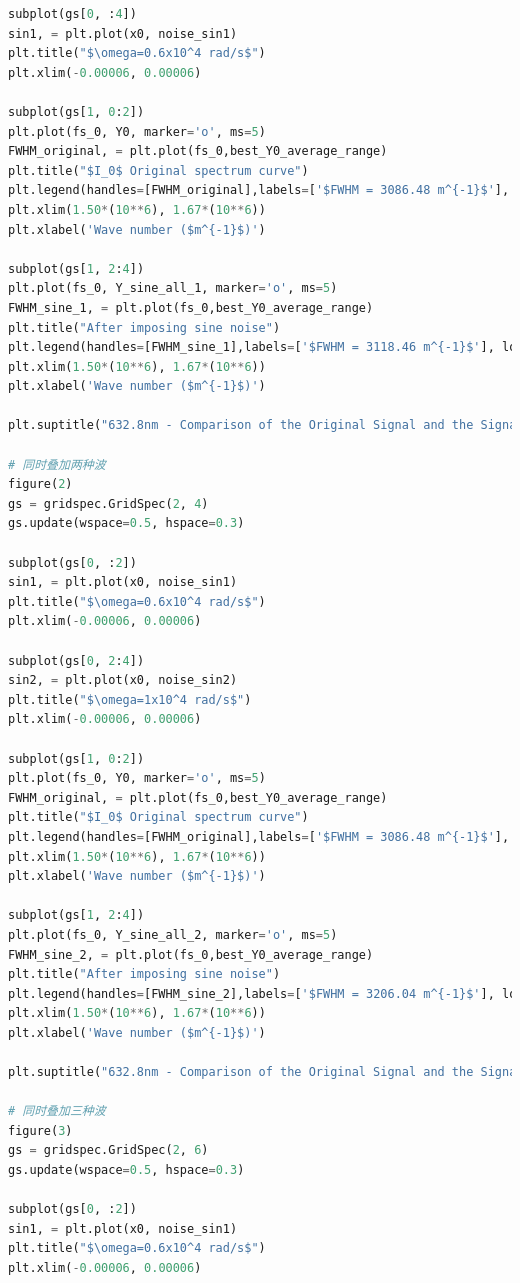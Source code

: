 \documentclass[conference]{IEEEtran}
\begin{document}
\begin{lstlisting}[language=python]
subplot(gs[0, :4])
sin1, = plt.plot(x0, noise_sin1)
plt.title("$\omega=0.6x10^4 rad/s$")
plt.xlim(-0.00006, 0.00006)

subplot(gs[1, 0:2])
plt.plot(fs_0, Y0, marker='o', ms=5)
FWHM_original, = plt.plot(fs_0,best_Y0_average_range)
plt.title("$I_0$ Original spectrum curve")
plt.legend(handles=[FWHM_original],labels=['$FWHM = 3086.48 m^{-1}$'], loc='upper right')
plt.xlim(1.50*(10**6), 1.67*(10**6))
plt.xlabel('Wave number ($m^{-1}$)')

subplot(gs[1, 2:4])
plt.plot(fs_0, Y_sine_all_1, marker='o', ms=5)
FWHM_sine_1, = plt.plot(fs_0,best_Y0_average_range)
plt.title("After imposing sine noise")
plt.legend(handles=[FWHM_sine_1],labels=['$FWHM = 3118.46 m^{-1}$'], loc='upper right')
plt.xlim(1.50*(10**6), 1.67*(10**6))
plt.xlabel('Wave number ($m^{-1}$)')

plt.suptitle("632.8nm - Comparison of the Original Signal and the Signal after Adding Sinusoidal Noise", fontsize = 20)

# 同时叠加两种波
figure(2)
gs = gridspec.GridSpec(2, 4)
gs.update(wspace=0.5, hspace=0.3)

subplot(gs[0, :2])
sin1, = plt.plot(x0, noise_sin1)
plt.title("$\omega=0.6x10^4 rad/s$")
plt.xlim(-0.00006, 0.00006)

subplot(gs[0, 2:4])
sin2, = plt.plot(x0, noise_sin2)
plt.title("$\omega=1x10^4 rad/s$")
plt.xlim(-0.00006, 0.00006)

subplot(gs[1, 0:2])
plt.plot(fs_0, Y0, marker='o', ms=5)
FWHM_original, = plt.plot(fs_0,best_Y0_average_range)
plt.title("$I_0$ Original spectrum curve")
plt.legend(handles=[FWHM_original],labels=['$FWHM = 3086.48 m^{-1}$'], loc='upper right')
plt.xlim(1.50*(10**6), 1.67*(10**6))
plt.xlabel('Wave number ($m^{-1}$)')

subplot(gs[1, 2:4])
plt.plot(fs_0, Y_sine_all_2, marker='o', ms=5)
FWHM_sine_2, = plt.plot(fs_0,best_Y0_average_range)
plt.title("After imposing sine noise")
plt.legend(handles=[FWHM_sine_2],labels=['$FWHM = 3206.04 m^{-1}$'], loc='upper right')
plt.xlim(1.50*(10**6), 1.67*(10**6))
plt.xlabel('Wave number ($m^{-1}$)')

plt.suptitle("632.8nm - Comparison of the Original Signal and the Signal after Adding Sinusoidal Noise", fontsize = 20)

# 同时叠加三种波
figure(3)
gs = gridspec.GridSpec(2, 6)
gs.update(wspace=0.5, hspace=0.3)

subplot(gs[0, :2])
sin1, = plt.plot(x0, noise_sin1)
plt.title("$\omega=0.6x10^4 rad/s$")
plt.xlim(-0.00006, 0.00006)


\end{lstlisting}
\end{document}

